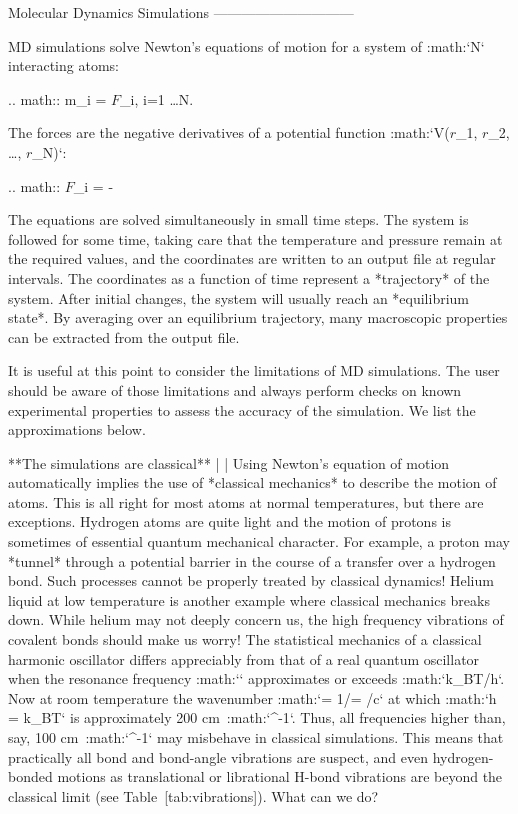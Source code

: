 Molecular Dynamics Simulations
------------------------------

MD simulations solve Newton’s equations of motion for a system of
:math:`N` interacting atoms:

.. math:: m_i   = {\mbox{\boldmath ${F}$}}_i, \;i=1 \ldots N.

 The forces are the negative derivatives of a potential function
:math:`V({\mbox{\boldmath ${r}$}}_1, 
{\mbox{\boldmath ${r}$}}_2, \ldots, {\mbox{\boldmath ${r}$}}_N)`:

.. math:: {\mbox{\boldmath ${F}$}}_i = - 

 The equations are solved simultaneously in small time steps. The system
is followed for some time, taking care that the temperature and pressure
remain at the required values, and the coordinates are written to an
output file at regular intervals. The coordinates as a function of time
represent a *trajectory* of the system. After initial changes, the
system will usually reach an *equilibrium state*. By averaging over an
equilibrium trajectory, many macroscopic properties can be extracted
from the output file.

It is useful at this point to consider the limitations of MD
simulations. The user should be aware of those limitations and always
perform checks on known experimental properties to assess the accuracy
of the simulation. We list the approximations below.

**The simulations are classical**
    | 
    | Using Newton’s equation of motion automatically implies the use of
      *classical mechanics* to describe the motion of atoms. This is all
      right for most atoms at normal temperatures, but there are
      exceptions. Hydrogen atoms are quite light and the motion of
      protons is sometimes of essential quantum mechanical character.
      For example, a proton may *tunnel* through a potential barrier in
      the course of a transfer over a hydrogen bond. Such processes
      cannot be properly treated by classical dynamics! Helium liquid at
      low temperature is another example where classical mechanics
      breaks down. While helium may not deeply concern us, the high
      frequency vibrations of covalent bonds should make us worry! The
      statistical mechanics of a classical harmonic oscillator differs
      appreciably from that of a real quantum oscillator when the
      resonance frequency :math:`\nu` approximates or exceeds
      :math:`k_BT/h`. Now at room temperature the wavenumber
      :math:`\sigma = 1/\lambda =
      \nu/c` at which :math:`h
      \nu = k_BT` is approximately 200 cm\ :math:`^{-1}`. Thus, all
      frequencies higher than, say, 100 cm\ :math:`^{-1}` may misbehave
      in classical simulations. This means that practically all bond and
      bond-angle vibrations are suspect, and even hydrogen-bonded
      motions as translational or librational H-bond vibrations are
      beyond the classical limit (see Table [tab:vibrations]). What can
      we do?

